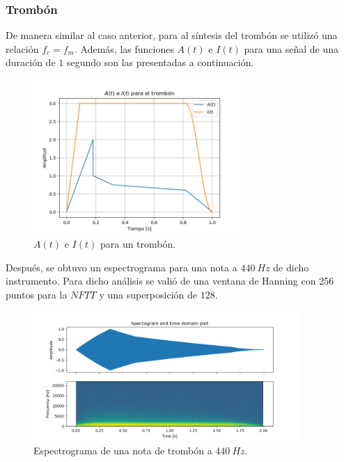 \subsubsection{Trombón}
De manera similar al caso anterior, para al síntesis del trombón se utilizó una relación $f_c = f_m$. Además, las funciones $A(t)$ e $I(t)$ para una señal de una duración de $1$ segundo son las presentadas a continuación.
\begin{figure}[H]
	\centering
	\includegraphics[width=0.7\textwidth]{ImagenesEjercicio3/A-I-Trombone.png}
	\caption{$A(t)$ e $I(t)$ para un trombón.}
	\label{fig:aitromb}
\end{figure}

Después, se obtuvo un espectrograma para una nota a $440 \ Hz$ de dicho instrumento. Para dicho análisis se valió de una ventana de Hanning con 256 puntos para la $NFTT$ y una superposición de $128$.  
\begin{figure}[H]
	\centering
	\includegraphics[width=0.9\textwidth]{ImagenesEjercicio3/Trombone-440-Hanning-256-128.png}
	\caption{Espectrograma de una nota de trombón a $440 \ Hz$.}
	\label{fig:spectromb}
\end{figure}

